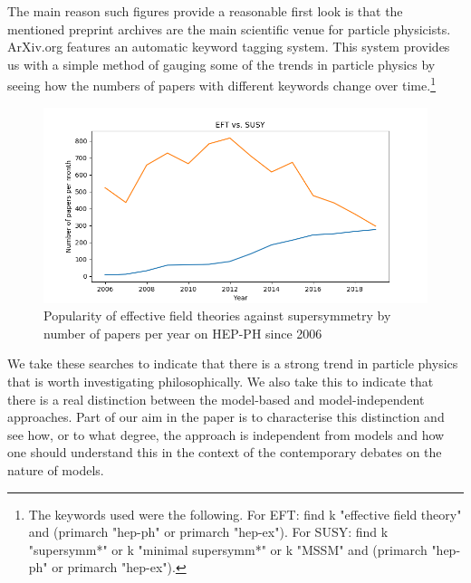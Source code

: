 The main reason such figures provide a reasonable first look is that the mentioned preprint archives are the main scientific venue for particle physicists.
ArXiv.org features an automatic keyword tagging system.
This system provides us with a simple method of gauging some of the trends in particle physics by seeing how the numbers of papers with different keywords change over time.\footnote{The keywords used were the following. For EFT: find k "effective field theory" and (primarch "hep-ph" or primarch "hep-ex"). For SUSY: find k "supersymm*" or k "minimal supersymm*" or k "MSSM" and (primarch "hep-ph" or primarch "hep-ex").} 
\begin{figure}[ht] \label{lineplot}
	\begin{center}
	\includegraphics[scale=0.7]{eftsusy2609}
	\caption{Popularity of effective field theories against supersymmetry by number of papers per year on HEP-PH since 2006}
	\end{center}
\end{figure}
We take these searches to indicate that there is a strong trend in particle physics that is worth investigating philosophically.
We also take this to indicate that there is a real distinction between the model-based and model-independent approaches. 
Part of our aim in the paper is to characterise this distinction and see how, or to what degree, the approach is independent from models and how one should understand this in the context of the contemporary debates on the nature of models.
